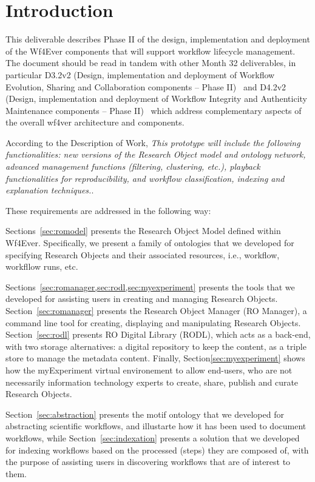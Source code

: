 \section{Introduction}

This deliverable describes Phase II of the design, implementation and
deployment of the Wf4Ever components that will support workflow
lifecycle management. The document should be read in tandem with other
Month 32 deliverables, in particular D3.2v2 (Design, implementation
and deployment of Workflow Evolution, Sharing and Collaboration
components -- Phase II)~\cite{D3.2v2} and D4.2v2 (Design,
implementation and deployment of Workflow Integrity and Authenticity
Maintenance components -- Phase II)~\cite{D4.2v2} which address
complementary aspects of the overall wf4ver architecture and
components.

According to the Description of Work, \emph{This prototype will include the following functionalities: new versions of the Research Object model and ontology network, advanced management functions (filtering, clustering, etc.), playback functionalities for reproducibility, and workflow classification, indexing and explanation techniques.}. 

These requirements are addressed in the following way:

Sections~\ref{sec:romodel} presents the Research Object Model defined within Wf4Ever. Specifically, we present a family of ontologies that we developed for specifying Research Objects and their associated resources, i.e., workflow, workfllow runs, etc. 

Sections~\ref{sec:romanager,sec:rodl,sec:myexperiment} presents the tools that we developed for assisting users in creating and managing Research Objects. Section~\ref{sec:romanager} presents the Research Object Manager (RO Manager), a command line tool for creating, displaying and manipulating Research Objects. Section~\ref{sec:rodl} presents RO Digital Library (RODL), which acts as a back-end, with two storage alternatives: a digital repository to keep the content, as a triple store to manage the metadata content. Finally, Section\ref{sec:myexperiment} shows how the myExperiment virtual environement to allow end-users, who are not necessarily information technology experts to create, share, publish and curate Research Objects.

Section~\ref{sec:abstraction} presents the motif ontology that we developed for abstracting scientific workflows, and illustarte how it has been used to document workflows, while Section~\ref{sec:indexation} presents a solution that we developed for indexing workflows based on the processed (steps) they are composed of, with the purpose of assisting users in discovering workflows that are of interest to them. 
